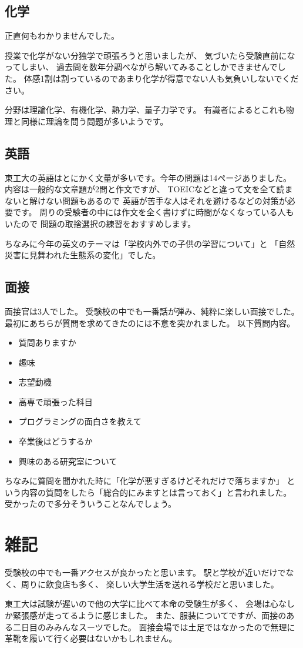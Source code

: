 \documentclass[]{jsarticle}
\begin{document}
    \subsection*{化学}
        正直何もわかりませんでした。

        授業で化学がない分独学で頑張ろうと思いましたが、
        気づいたら受験直前になってしまい、
        過去問を数年分調べながら解いてみることしかできませんでした。
        体感1割は割っているのであまり化学が得意でない人も気負いしないでください。

        分野は理論化学、有機化学、熱力学、量子力学です。
        有識者によるとこれも物理と同様に理論を問う問題が多いようです。
    \subsection*{英語}
        東工大の英語はとにかく文量が多いです。今年の問題は14ページありました。
        内容は一般的な文章題が2問と作文ですが、
        TOEICなどと違って文を全て読まないと解けない問題もあるので
        英語が苦手な人はそれを避けるなどの対策が必要です。
        周りの受験者の中には作文を全く書けずに時間がなくなっている人もいたので
        問題の取捨選択の練習をおすすめします。

        ちなみに今年の英文のテーマは「学校内外での子供の学習について」と
        「自然災害に見舞われた生態系の変化」でした。
    \subsection*{面接}
        面接官は3人でした。
        受験校の中でも一番話が弾み、純粋に楽しい面接でした。
        最初にあちらが質問を求めてきたのには不意を突かれました。
        以下質問内容。
        \begin{itemize}
            \item 質問ありますか
            \item 趣味
            \item 志望動機
            \item 高専で頑張った科目
            \item プログラミングの面白さを教えて
            \item 卒業後はどうするか
            \item 興味のある研究室について
        \end{itemize}

        ちなみに質問を聞かれた時に「化学が悪すぎるけどそれだけで落ちますか」
        という内容の質問をしたら「総合的にみますとは言っておく」と言われました。
        受かったので多分そういうことなんでしょう。
\section*{雑記}
    受験校の中でも一番アクセスが良かったと思います。
    駅と学校が近いだけでなく、周りに飲食店も多く、
    楽しい大学生活を送れる学校だと思いました。

    東工大は試験が遅いので他の大学に比べて本命の受験生が多く、
    会場は心なしか緊張感が走ってるように感じました。
    また、服装についてですが、面接のある二日目のみみんなスーツでした。
    面接会場では土足ではなかったので無理に革靴を履いて行く必要はないかもしれません。
\end{document}

